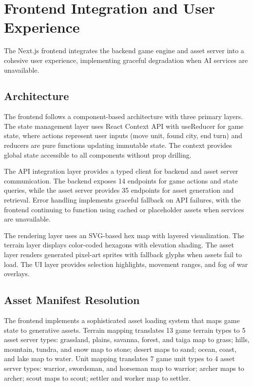 \documentclass[conference]{IEEEtran}
\begin{document}
\section{Frontend Integration and User Experience}
\label{sec:frontend}

The Next.js frontend integrates the backend game engine and asset server into a cohesive user experience, implementing graceful degradation when AI services are unavailable.

\subsection{Architecture}

The frontend follows a component-based architecture with three primary layers. The state management layer uses React Context API with useReducer for game state, where actions represent user inputs (move unit, found city, end turn) and reducers are pure functions updating immutable state. The context provides global state accessible to all components without prop drilling.

The API integration layer provides a typed client for backend and asset server communication. The backend exposes 14 endpoints for game actions and state queries, while the asset server provides 35 endpoints for asset generation and retrieval. Error handling implements graceful fallback on API failures, with the frontend continuing to function using cached or placeholder assets when services are unavailable.

The rendering layer uses an SVG-based hex map with layered visualization. The terrain layer displays color-coded hexagons with elevation shading. The asset layer renders generated pixel-art sprites with fallback glyphs when assets fail to load. The UI layer provides selection highlights, movement ranges, and fog of war overlays.

\subsection{Asset Manifest Resolution}

The frontend implements a sophisticated asset loading system that maps game state to generative assets. Terrain mapping translates 13 game terrain types to 5 asset server types: grassland, plains, savanna, forest, and taiga map to grass; hills, mountain, tundra, and snow map to stone; desert maps to sand; ocean, coast, and lake map to water. Unit mapping translates 7 game unit types to 4 asset server types: warrior, swordsman, and horseman map to warrior; archer maps to archer; scout maps to scout; settler and worker map to settler.
\end{document}
